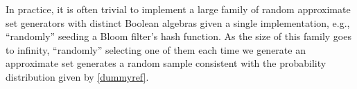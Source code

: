 \documentclass[ ../main.tex]{subfiles}
\begin{document}
In practice, it is often trivial to implement a large family of random approximate set generators with distinct Boolean algebras given a single implementation, e.g., ``randomly'' seeding a Bloom filter's hash function. As the size of this family goes to infinity, ``randomly'' selecting one of them each time we generate an approximate set generates a random sample consistent with the probability distribution given by \cref{dummyref}.   

\end{document}
